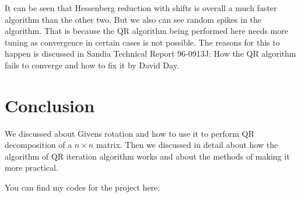 \documentclass[journal]{IEEEtran}
\numberwithin{equation}{section}
\begin{document}
It can be seen that Hessenberg reduction with shifts is overall a much faster algorithm than the other two. But we also can see random spikes in the algorithm. 
That is because the QR algorithm being performed here needs more tuning as convergence in certain cases is not possible.
The reasons for this to happen is discussed in Sandia Technical Report 96-0913J: How the QR algorithm fails to converge and how to fix it by David Day.

\section{Conclusion}

We discussed about Givens rotation and how to use it to perform QR decomposition of a $n \times n$ matrix. Then we discussed in detail about how the algorithm of QR iteration algorithm works and about the methods of making it more practical. 

You can find my codes for the project here:
\end{document}
